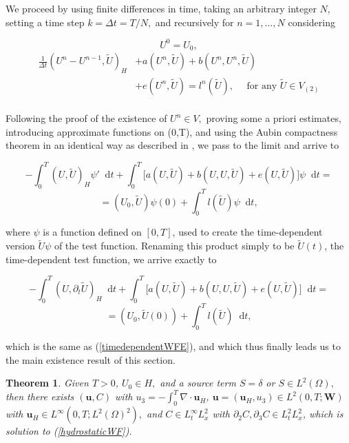 \documentclass[11pt]{article}
\newtheorem{theorem}{Theorem}
\newcommand*\diff{\mathop{}\!\mathrm{d}}
\begin{document}
We proceed by using finite differences in time, taking an arbitrary integer $N,$ setting a time step $k = \Delta t = T/N,$ and recursively for $n = 1, ... , N$ considering

\[ U^0 = U_0,\]
\begin{equation}
  \begin{split}
    \frac{1}{\Delta t} (U^n - U^{n-1}, \tilde{U})_H & +  a(U^n, \tilde{U}) + b(U^n,U^n, \tilde{U})\\
    & + e(U^n, \tilde{U}) = l^n(\tilde{U}), \quad \text{ for any } \tilde{U} \in V_{(2)} \\
  \end{split}
\end{equation}

Following the proof of the existence of $U^n \in V,$ proving some a priori estimates, introducing approximate functions on (0,T), and using the Aubin compactness theorem in an identical way as described in \cite{temam2005some}, we pass to the limit and arrive to

\[ - \int_0^T (U, \tilde{U})_H \psi ' \diff t + \int_0^T \big [ a(U, \tilde{U}) + b(U,U, \tilde{U}) + e(U, \tilde{U}) \big ] \psi \diff t = \]
\[ = (U_0, \tilde{U}) \psi (0) + \int_0 ^ T l(\tilde{U}) \psi \diff t, \]

where $\psi$ is a function defined on $[0,T]$, used to create the time-dependent version $\tilde{U}\psi$ of the test function. Renaming this product simply to be $\tilde{U}(t)$, the time-dependent test function, we arrive exactly to

\[ - \int_0^T (U, \partial_t \tilde{U})_H \diff t + \int_0^T \big [ a(U, \tilde{U}) + b(U,U, \tilde{U}) + e(U, \tilde{U}) \big ] \diff t = \]
\[ = (U_0, \tilde{U}(0)) + \int_0 ^ T l(\tilde{U}) \diff t, \]

which is the same as (\ref{timedependentWFE}), and which thus finally leads us to the main existence result of this section.

\begin{theorem}

Given $T > 0$, $U_0 \in H,$ and a source term $S = \delta$ or $S \in L^2(\Omega),$ then there exists $(\mathbf{u}, C)$ with $u_3 = - \int_0^T \nabla \cdot \mathbf{u}_H$, $\mathbf{u} = (\mathbf{u}_H, u_3) \in L^2 (0, T; \mathbf{W})$ with $\mathbf{u}_H \in L^\infty (0,T; L^2(\Omega)^2),$ and $C \in L_t^\infty L_x^2$ with $\partial_2 C, \partial_3 C \in L^2_t L^2_x$, which is solution to (\ref{hydrostaticWF}).

\end{theorem}

\nocite{*}


\end{document}
